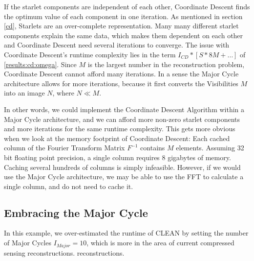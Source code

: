 If the starlet components are independent of each other, Coordinate Descent finds the optimum value of each component in one iteration. As mentioned in section \ref{cd}, Starlets are an over-complete representation. Many many different starlet components explain the same data, which makes them dependent on each other and Coordinate Descent need several iterations to converge. The issue with Coordinate Descent's runtime complexity lies in the term $ I_{CD} * [S * 8M +\ldots]$ of \eqref{results:cd:omega}. Since $M$ is the largest number in the reconstruction problem, Coordinate Descent cannot afford many iterations. In a sense the Major Cycle architecture allows for more iterations, because it first converts the Visibilities $M$ into an image $N$, where $N \ll M$.

In other words, we could implement the Coordinate Descent Algorithm within a Major Cycle architecture, and we can afford more non-zero starlet components and more iterations for the same runtime complexity. This gets more obvious when we look at the memory footprint of Coordinate Descent: Each cached column of the Fourier Transform Matrix $F^{-1}$ contains $M$ elements. Assuming 32 bit floating point precision, a single column requires 8 gigabytes of memory. Caching several hundreds of columns is simply infeasible. However, if we would use the Major Cycle architecture, we may be able to use the FFT to calculate a single column, and do not need to cache it.

\subsection{Embracing the Major Cycle}


In this example, we over-estimated the runtime of CLEAN by setting the number of Major Cycles $I_{Major} = 10$, which is more in the area of current compressed sensing reconstructions. reconstructions. 

